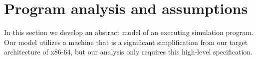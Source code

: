 %
%

\section{Program analysis and assumptions}
\label{sec:model}

In this section we develop an abstract model of an executing simulation
program.  Our model utilizes a machine that is a significant
simplification from our target architecture of x86-64, but our analysis
only requires this high-level specification.


